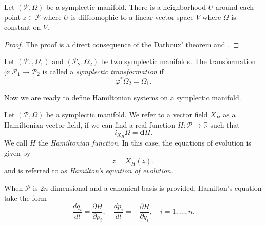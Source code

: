 \begin{corollary} \label{theorem:2.8}
Let $(\mathcal P, \Omega)$ be a symplectic manifold. There is a neighborhood $U$ around each point $z\in \mathcal P$ where $U$ is diffeomophic to a linear vector space $V$ where $\Omega$ is constant on $V$.
\end{corollary}
\begin{proof}
The proof is a direct consequence of the Darboux' theorem and .
\end{proof}

\begin{definition}
Let $(\mathcal P_1,\Omega_1)$ and $(\mathcal P_2,\Omega_2)$ be two symplectic manifolds. The transformation $\varphi:\mathcal P_1 \to \mathcal P_2$ is called a \emph{symplectic transformation} if
\begin{equation} \label{eq:2.16}
	\varphi^* \Omega_2 = \Omega_1.
\end{equation}
\end{definition}

Now we are ready to define Hamiltonian systems on a symplectic manifold.

\begin{definition}
Let $(\mathcal P,\Omega)$ be a symplectic manifold. We refer to a vector field $X_H$ as a Hamiltonian vector field, if we can find a real function $H:\mathcal P \to \mathbb R$ such that
\begin{equation} \label{eq:2.17}
	i_{X_H}\Omega = \mathbf d H.
\end{equation}
We call $H$ the \emph{Hamiltonian function}. In this case, the equations of evolution is given by
\begin{equation} \label{eq:2.18}
	\dot z = X_H(z),
\end{equation}
and is referred to as \emph{Hamilton's equation of evolution}.
\end{definition}
When $\mathcal P$ is $2n$-dimensional and a canonical basis is provided, Hamilton's equation take the form
\begin{equation} \label{eq:2.19}
	\frac{dq_i}{dt} = \frac{\partial H}{\partial p_i}, \quad \frac{dp_i}{dt} = - \frac{\partial H}{\partial q_i}, \quad i=1,\dots,n .
\end{equation}


